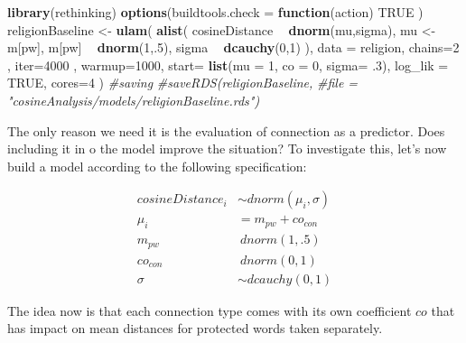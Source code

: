 \documentclass[12pt,]{book}
\newenvironment{Shaded}{\begin{snugshade}}{\end{snugshade}}
\newcommand{\KeywordTok}[1]{\textcolor[rgb]{0.13,0.29,0.53}{\textbf{#1}}}
\newcommand{\DataTypeTok}[1]{\textcolor[rgb]{0.13,0.29,0.53}{#1}}
\newcommand{\DecValTok}[1]{\textcolor[rgb]{0.00,0.00,0.81}{#1}}
\newcommand{\FloatTok}[1]{\textcolor[rgb]{0.00,0.00,0.81}{#1}}
\newcommand{\StringTok}[1]{\textcolor[rgb]{0.31,0.60,0.02}{#1}}
\newcommand{\CommentTok}[1]{\textcolor[rgb]{0.56,0.35,0.01}{\textit{#1}}}
\newcommand{\OtherTok}[1]{\textcolor[rgb]{0.56,0.35,0.01}{#1}}
\newcommand{\ControlFlowTok}[1]{\textcolor[rgb]{0.13,0.29,0.53}{\textbf{#1}}}
\newcommand{\OperatorTok}[1]{\textcolor[rgb]{0.81,0.36,0.00}{\textbf{#1}}}
\newcommand{\NormalTok}[1]{#1}
\begin{document}
\begin{Shaded}
\begin{Highlighting}[]
\KeywordTok{library}\NormalTok{(rethinking)}
\KeywordTok{options}\NormalTok{(}\DataTypeTok{buildtools.check =} \ControlFlowTok{function}\NormalTok{(action) }\OtherTok{TRUE}\NormalTok{ )}
\NormalTok{religionBaseline <-}\StringTok{ }\KeywordTok{ulam}\NormalTok{(}
  \KeywordTok{alist}\NormalTok{(}
\NormalTok{    cosineDistance }\OperatorTok{~}\StringTok{ }\KeywordTok{dnorm}\NormalTok{(mu,sigma),}
\NormalTok{    mu <-}\StringTok{ }\NormalTok{m[pw],}
\NormalTok{    m[pw] }\OperatorTok{~}\StringTok{ }\KeywordTok{dnorm}\NormalTok{(}\DecValTok{1}\NormalTok{,.}\DecValTok{5}\NormalTok{),}
\NormalTok{    sigma }\OperatorTok{~}\StringTok{ }\KeywordTok{dcauchy}\NormalTok{(}\DecValTok{0}\NormalTok{,}\DecValTok{1}\NormalTok{)}
\NormalTok{  ),}
  \DataTypeTok{data =}\NormalTok{ religion,}
  \DataTypeTok{chains=}\DecValTok{2}\NormalTok{ , }\DataTypeTok{iter=}\DecValTok{4000}\NormalTok{ , }\DataTypeTok{warmup=}\DecValTok{1000}\NormalTok{,}
  \DataTypeTok{start=} \KeywordTok{list}\NormalTok{(}\DataTypeTok{mu =} \DecValTok{1}\NormalTok{, }\DataTypeTok{co =} \DecValTok{0}\NormalTok{, }\DataTypeTok{sigma=} \FloatTok{.3}\NormalTok{),}
  \DataTypeTok{log_lik =} \OtherTok{TRUE}\NormalTok{, }\DataTypeTok{cores=}\DecValTok{4}
\NormalTok{)}
\CommentTok{#saving}
\CommentTok{#saveRDS(religionBaseline, }
\CommentTok{#file = "cosineAnalysis/models/religionBaseline.rds")}
\end{Highlighting}
\end{Shaded}

The only reason we need it is the evaluation of connection as a
predictor. Does including it in o the model improve the situation? To
investigate this, let's now build a model according to the following
specification:

\begin{align}
cosineDistance_i  & \sim dnorm(\mu_i, \sigma) \\
\mu_i & = m_{pw} + co_{con}\\
m_{pw} & ~ dnorm(1,.5) \\
co_{con} & ~ dnorm(0,1) \\
\sigma &\sim  dcauchy(0,1)
\end{align}

\noindent The idea now is that each connection type comes with its own
coefficient \(co\) that has impact on mean distances for protected words
taken separately.

\vspace{1mm} \footnotesize
\end{document}
